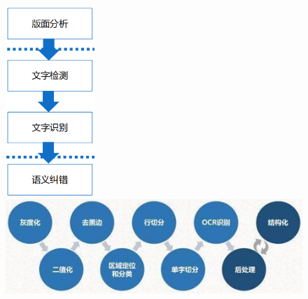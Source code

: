 \documentclass[11pt]{ctexbeamer}
\begin{document}
\begin{frame}
\begin{columns}
\begin{figure}
    \includegraphics[width=0.3\textwidth]{scDNA_OCR_09.png}\\ \vspace{0.7em}
    \includegraphics[width=\textwidth]{scDNA_OCR_10.png}
  \end{figure}
  \end{columns}
\end{frame}
\end{document}

